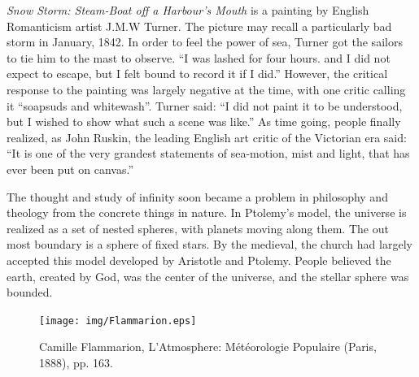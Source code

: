 \documentclass{article}
\begin{document}
{\em Snow Storm: Steam-Boat off a Harbour's Mouth} is a painting by English Romanticism artist J.M.W Turner. The picture may recall a particularly bad storm in January, 1842. In order to feel the power of sea, Turner got the sailors to tie him to the mast to observe. ``I was lashed for four hours. and I did not expect to escape, but I felt bound to record it if I did.'' However, the critical response to the painting was largely negative at the time, with one critic calling it ``soapsuds and whitewash''. Turner said: ``I did not paint it to be understood, but I wished to show what such a scene was like.'' As time going, people finally realized, as John Ruskin, the leading English art critic of the Victorian era said: ``It is one of the very grandest statements of sea-motion, mist and light, that has ever been put on canvas.''

The thought and study of infinity soon became a problem in philosophy and theology from the concrete things in nature. In Ptolemy's model, the universe is realized as a set of nested spheres, with planets moving along them. The out most boundary is a sphere of fixed stars. By the medieval, the church had largely accepted this model developed by Aristotle and Ptolemy. People believed the earth, created by God, was the center of the universe, and the stellar sphere was bounded.

\begin{figure}[htbp]
 \centering
 \texttt{[image: img/Flammarion.eps]}
 \captionsetup{labelformat=empty}
 \caption{Camille Flammarion, L'Atmosphere: Météorologie Populaire (Paris, 1888), pp. 163.}
 \label{fig:Flamarion-woodcut}
\end{figure}



\end{document}
